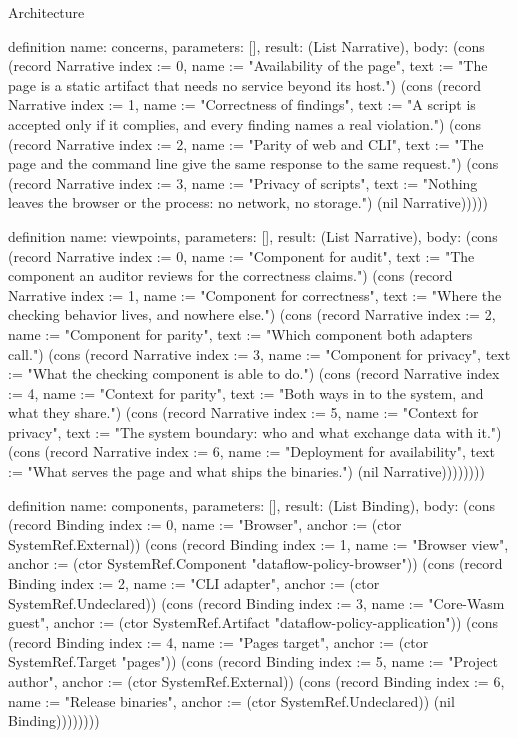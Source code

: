 \begin{lexlean}{Architecture}
\begin{semanticmodule}
definition{
  name: concerns,
  parameters: [],
  result: (List Narrative),
  body: (cons (record Narrative {index := 0, name := "Availability of the page", text := "The page is a static artifact that needs no service beyond its host."}) (cons (record Narrative {index := 1, name := "Correctness of findings", text := "A script is accepted only if it complies, and every finding names a real violation."}) (cons (record Narrative {index := 2, name := "Parity of web and CLI", text := "The page and the command line give the same response to the same request."}) (cons (record Narrative {index := 3, name := "Privacy of scripts", text := "Nothing leaves the browser or the process: no network, no storage."}) (nil Narrative)))))
}

definition{
  name: viewpoints,
  parameters: [],
  result: (List Narrative),
  body: (cons (record Narrative {index := 0, name := "Component for audit", text := "The component an auditor reviews for the correctness claims."}) (cons (record Narrative {index := 1, name := "Component for correctness", text := "Where the checking behavior lives, and nowhere else."}) (cons (record Narrative {index := 2, name := "Component for parity", text := "Which component both adapters call."}) (cons (record Narrative {index := 3, name := "Component for privacy", text := "What the checking component is able to do."}) (cons (record Narrative {index := 4, name := "Context for parity", text := "Both ways in to the system, and what they share."}) (cons (record Narrative {index := 5, name := "Context for privacy", text := "The system boundary: who and what exchange data with it."}) (cons (record Narrative {index := 6, name := "Deployment for availability", text := "What serves the page and what ships the binaries."}) (nil Narrative))))))))
}

definition{
  name: components,
  parameters: [],
  result: (List Binding),
  body: (cons (record Binding {index := 0, name := "Browser", anchor := (ctor SystemRef.External)}) (cons (record Binding {index := 1, name := "Browser view", anchor := (ctor SystemRef.Component "dataflow-policy-browser")}) (cons (record Binding {index := 2, name := "CLI adapter", anchor := (ctor SystemRef.Undeclared)}) (cons (record Binding {index := 3, name := "Core-Wasm guest", anchor := (ctor SystemRef.Artifact "dataflow-policy-application")}) (cons (record Binding {index := 4, name := "Pages target", anchor := (ctor SystemRef.Target "pages")}) (cons (record Binding {index := 5, name := "Project author", anchor := (ctor SystemRef.External)}) (cons (record Binding {index := 6, name := "Release binaries", anchor := (ctor SystemRef.Undeclared)}) (nil Binding))))))))
}


\end{semanticmodule}
\end{lexlean}
